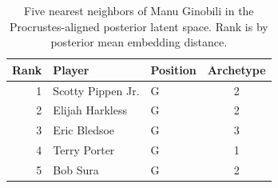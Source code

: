 \begin{table}[htbp]
  \centering\small
  \begin{tabular}{rllc}
    \toprule
    Rank & Player & Position & Archetype \\
    \midrule
    1 & Scotty Pippen Jr. & G & 2 \\
    2 & Elijah Harkless & G & 2 \\
    3 & Eric Bledsoe & G & 3 \\
    4 & Terry Porter & G & 1 \\
    5 & Bob Sura & G & 2 \\
    \bottomrule
  \end{tabular}
  \caption{Five nearest neighbors of Manu Ginobili in the Procrustes-aligned posterior latent space. Rank is by posterior mean embedding distance.}
  \label{tab:Manu_Ginobili_neighbors}
\end{table}

